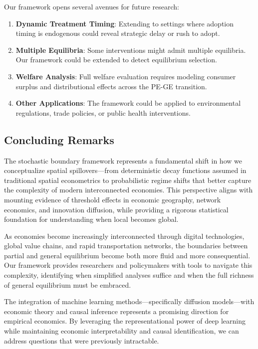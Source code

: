 Our framework opens several avenues for future research:

\begin{enumerate}
\item \textbf{Dynamic Treatment Timing}: Extending to settings where adoption timing is endogenous could reveal strategic delay or rush to adopt.

\item \textbf{Multiple Equilibria}: Some interventions might admit multiple equilibria. Our framework could be extended to detect equilibrium selection.

\item \textbf{Welfare Analysis}: Full welfare evaluation requires modeling consumer surplus and distributional effects across the PE-GE transition.

\item \textbf{Other Applications}: The framework could be applied to environmental regulations, trade policies, or public health interventions.
\end{enumerate}

\subsection{Concluding Remarks}

The stochastic boundary framework represents a fundamental shift in how we conceptualize spatial spillovers—from deterministic decay functions assumed in traditional spatial econometrics to probabilistic regime shifts that better capture the complexity of modern interconnected economies. This perspective aligns with mounting evidence of threshold effects in economic geography, network economics, and innovation diffusion, while providing a rigorous statistical foundation for understanding when local becomes global.

As economies become increasingly interconnected through digital technologies, global value chains, and rapid transportation networks, the boundaries between partial and general equilibrium become both more fluid and more consequential. Our framework provides researchers and policymakers with tools to navigate this complexity, identifying when simplified analyses suffice and when the full richness of general equilibrium must be embraced. 

The integration of machine learning methods—specifically diffusion models—with economic theory and causal inference represents a promising direction for empirical economics. By leveraging the representational power of deep learning while maintaining economic interpretability and causal identification, we can address questions that were previously intractable.

